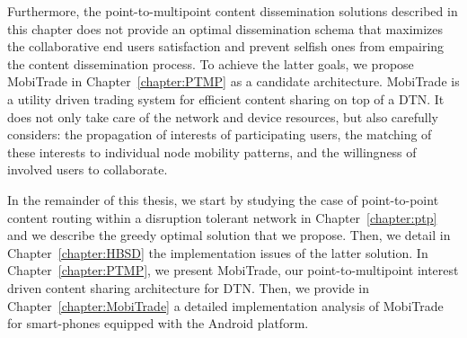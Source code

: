 Furthermore, the point-to-multipoint content dissemination solutions described in this chapter does not provide an optimal dissemination schema that maximizes the collaborative end users satisfaction and prevent selfish ones from empairing the content dissemination process. To achieve the latter goals, we propose MobiTrade in Chapter~\ref{chapter:PTMP} as a candidate architecture. MobiTrade is a utility driven trading system for efficient content sharing on top of a DTN. It does not only take care of the network and device resources, but also carefully considers: the propagation of interests of participating users, the matching of these interests to individual node mobility patterns, and the willingness of involved users to collaborate.

In the remainder of this thesis, we start by studying the case of point-to-point content routing within a disruption tolerant network in Chapter~\ref{chapter:ptp} and we describe the greedy optimal solution that we propose. Then, we detail in Chapter~\ref{chapter:HBSD} the implementation issues of the latter solution. In Chapter~\ref{chapter:PTMP}, we present MobiTrade, our point-to-multipoint interest driven content sharing architecture for DTN. Then, we provide in Chapter~\ref{chapter:MobiTrade} a detailed implementation analysis of MobiTrade for smart-phones equipped with the Android platform.


